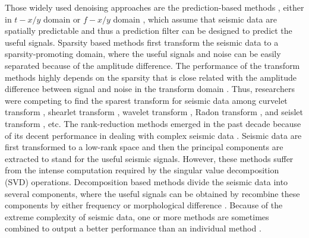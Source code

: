 Those widely used denoising approaches are the prediction-based methods \cite[]{canales1984,siwei2015}, either in $t-x/y$ domain \cite[]{abma1995} or $f-x/y$ domain \cite[]{guochang2012,guochang2013}, which assume that seismic data are spatially predictable and thus a prediction filter can be designed to predict the useful signals. Sparsity based methods first transform the seismic data to a sparsity-promoting domain, where the useful signals and noise can be easily separated because of the amplitude difference. The performance of the transform methods highly depends on the sparsity that is close related with the amplitude difference between signal and noise in the transform domain \cite[]{amir2017,amir2017geo}. Thus, researchers were competing to find the sparest transform for seismic data among curvelet transform \cite[]{neelamani2008}, shearlet transform \cite[]{zhang2018multicomponent}, wavelet transform \cite[]{mostafa2016geo}, Radon transform \cite[]{wenkai2013}, and seislet transform \cite[]{fomel2010seislet,liuyang2010oc,shuwei20163}, etc. The rank-reduction methods emerged in the past decade because of its decent performance in dealing with complex seismic data \cite[]{mssa,weilin2016dmssa,yangkang2016irr5d,wang2020low}. Seismic data are first transformed to a low-rank space and then the principal components are extracted to stand for the useful seismic signals. However, these methods suffer from the intense computation required by the singular value decomposition (SVD) operations. Decomposition based methods divide the seismic data into several components, where the useful signals can be obtained by recombine these components by either frequency or morphological difference \cite[]{weilin2017gji}. Because of the extreme complexity of seismic data, one or more methods are sometimes combined to output a better performance than an individual method \cite[]{yangkang20141}. 

